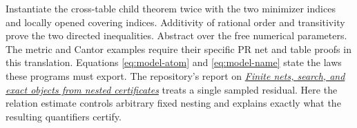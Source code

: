Instantiate the cross-table child theorem twice with the two minimizer
indices and locally opened covering indices. Additivity of rational order
and transitivity prove the two directed inequalities. Abstract over the
free numerical parameters. The metric and Cantor examples require their
specific PR net and table proofs in this translation. Equations
\eqref{eq:model-atom} and \eqref{eq:model-name} state the laws these
programs must export. The repository's report on
\href{https://github.com/VladimirReshetnikov/ProveIt/blob/5f3be02388442f16487d2dc5c2529961dd783d2b/Logic/PrimitiveRecursiveArithmetic/docs/proofs/foundations/ipra_embedding_framework_2026-11-15/paper/sections/08_existence_compactness.tex}{\emph{Finite nets, search, and exact objects from nested certificates}} treats a
single sampled residual. Here the relation estimate controls arbitrary
fixed nesting and explains exactly what the resulting quantifiers certify.
